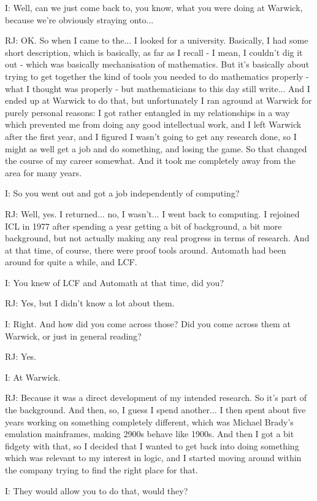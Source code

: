 \documentclass[10pt,titlepage]{book}
\begin{document}
I: Well, can we just come back to, you know, what you were doing at Warwick, because we're obviously straying onto...

RJ: OK. So when I came to the... I looked for a university. Basically, I had some short description, which is basically, as far as I recall - I mean, I couldn't dig it out - which was basically mechanisation of mathematics. But it's basically about trying to get together the kind of tools you needed to do mathematics properly - what I thought was properly - but mathematicians to this day still write... And I ended up at Warwick to do that, but unfortunately I ran aground at Warwick for purely personal reasons: I got rather entangled in my relationships in a way which prevented me from doing any good intellectual work, and I left Warwick after the first year, and I figured I wasn't going to get any research done, so I might as well get a job and do something, and losing the game. So that changed the course of my career somewhat. And it took me completely away from the area for many years.

I: So you went out and got a job independently of computing?

RJ: Well, yes. I returned... no, I wasn't... I went back to computing. I rejoined ICL in 1977 after spending a year getting a bit of background, a bit more background, but not actually making any real progress in terms of research. And at that time, of course, there were proof tools around. Automath had been around for quite a while, and LCF.

I: You knew of LCF and Automath at that time, did you?

RJ: Yes, but I didn't know a lot about them.

I: Right. And how did you come across those? Did you come across them at Warwick, or just in general reading?

RJ: Yes.

I: At Warwick.

RJ: Because it was a direct development of my intended research. So it's part of the background. And then, so, I guess I spend another... I then spent about five years working on something completely different, which was Michael Brady's emulation mainframes, making 2900s behave like 1900s. And then I got a bit fidgety with that, so I decided that I wanted to get back into doing something which was relevant to my interest in logic, and I started moving around within the company trying to find the right place for that.

I: They would allow you to do that, would they?
\end{document}
